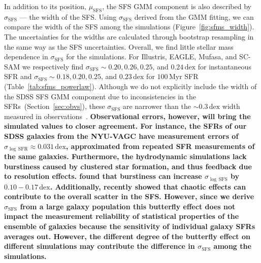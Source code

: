 \documentclass[tighten, preprint]{aastex62}
\begin{document}

In addition to its position, $\mu_\mathrm{SFS}$, the SFS GMM component 
is also described by $\sigma_\mathrm{SFS}$ --- the width of the SFS. 
Using $\sigma_\mathrm{SFS}$ derived from the GMM fitting, 
we can compare the width of the SFS among the simulations 
(Figure~\ref{fig:sfms_width}). The uncertainties for the widths are 
calculated through bootstrap resampling in the same way as the SFS 
uncertainties. Overall, we find little stellar mass  dependence in 
$\sigma_\mathrm{SFS}$ for the simulations. For Illustris, EAGLE, 
{\sc Mufasa}, and SC-SAM we respectively find 
$\sigma_\mathrm{SFS}{\sim}0.20, 0.26, 0.25$, and $0.24\,\mathrm{dex}$ 
for instantaneous SFR and
$\sigma_\mathrm{SFS}{\sim}0.18, 0.20, 0.25$, and $0.23\,\mathrm{dex}$
for $100\,\mathrm{Myr}$ SFR (Table~\ref{tab:sfms_powerlaw}). 
Although we do not explicitly include the width of the SDSS SFS GMM 
component due to inconsistencies in the SFRs~(Section~\ref{sec:obvs}), 
these $\sigma_\mathrm{SFS}$ are narrower than the ${\sim}0.3\,\mathrm{dex}$ 
width measured in  observations~\citep[\emph{e.g.}][]{daddi2007, noeske2007, salim2007, magdis2012, whitaker2012, speagle2014}. 
{\bf \color{red} 
Observational errors, however, will bring the simulated values to 
closer agreement. For instance, the SFRs of our SDSS galaxies from 
the NYU-VAGC have measurement errors of 
$\sigma_{\log\,\mathrm{SFR}} \approx 0.031\,\mathrm{dex}$, approximated 
from repeated SFR measurements of the same galaxies. Furthermore, the 
hydrodynamic simulations lack burstiness caused by 
clustered star formation, and thus feedback due to resolution effects. 
\citet{sparre2017a} found that burstiness can increase $\sigma_{\log\,\mathrm{SFS}}$ 
by $0.10-0.17\,\mathrm{dex}$. Additionally, \citet{genel2018} recently 
showed that chaotic effects can contribute to the overall scatter in the SFS. 
However, since we derive $\sigma_\mathrm{SFS}$ from a large galaxy population 
this butterfly effect does not impact the measurement reliability of statistical 
properties of the ensemble of galaxies because the sensitivity of individual 
galaxy SFRs averages out. However, the different degree of the 
butterfly effect on different simulations may contribute the difference 
in $\sigma_\mathrm{SFS}$  among the simulations.
} %
\end{document}
